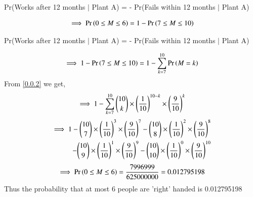 \documentclass[journal,12pt,twocolumn]{IEEEtran}
\begin{document}
\begin{center}
    Pr(Works after 12 months $\mid$ Plant A) =  - Pr(Fails within 12 months $\mid$ Plant A)\\
\end{center}
\begin{align}
    \implies \Pr\left(0\leq M \leq 6\right) = 1 - \Pr\left(7 \leq M \leq10\right)\label{0.0.3}
\end{align}
\begin{center}
    Pr(Works after 12 months $\mid$ Plant A) =  - Pr(Fails within 12 months $\mid$ Plant A)
\end{center}
\begin{align}
    \implies 1 - \Pr\left(7 \leq M \leq 10\right) = 1 - \sum_{k=7}^{10} \Pr\left(M=k\right)\label{0.0.4}
\end{align}
From \eqref{0.0.2} we get,
\begin{align}
    \implies 1 - \sum_{k=7}^{10} {{10}\choose{k}} \times \left(\frac{1}{10}\right)^{10-k} \times \left(\frac{9}{10}\right)^{k}\label{0.0.5}
\end{align}
\begin{align}
    \begin{split}
        \implies 1 - {{10}\choose{7}} \times \brak{\frac{1}{10}}^{3} \times \brak{\frac{9}{10}}^{7} - {{10}\choose{8}} \times \brak{\frac{1}{10}}^{2} \times \brak{\frac{9}{10}}^{8}
        \bigskip\\
        -{{10}\choose{9}} \times \brak{\frac{1}{10}}^{1} \times \brak{\frac{9}{10}}^{9} - {{10}\choose{10}} \times \brak{\frac{1}{10}}^{0}\times
        \brak{\frac{9}{10}}^{10}\label{0.0.6}
    \end{split}
\end{align}
\begin{align}
    \implies \Pr\left(0 \leq M \leq 6\right) = \frac{7996999}{625000000} = 0.012795198\notag
\end{align}
\bigskip
Thus the probability that at most 6 people are 'right' handed is 0.012795198
\pagebreak
\end{document}
